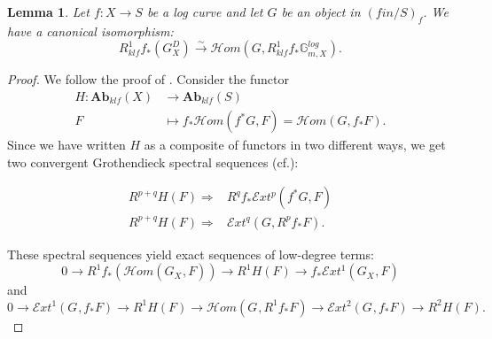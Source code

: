 \documentclass[a4paper,11pt]{amsart} %
\numberwithin{equation}{subsection}
\newcommand{\bd}[1]{{\mathbf{#1}}}
\def\sheafhom{\mathcal{H}om}
\def\sheafext{\mathcal{E}xt}
\newcommand{\cat}[1]{\bd{#1}}
\newcommand{\lra}{\longrightarrow}
\newcommand{\iso}{\stackrel{\sim}{\lra}}
\theoremstyle{definition}
\theoremstyle{plain}%
\newtheorem{lemma}[definition]{Lemma}
\theoremstyle{remark}
\begin{document}
\begin{lemma}\label{raynaudlog}
 Let $f: X \to S $ be a log curve and let $G$ be an object in $(fin/S)_f$. We have a canonical isomorphism:
 $$R^1_{klf}f_*(G_{X_{}}^D) \iso \sheafhom(G, R^1_{klf}f_*\mathbb{G}_{m,X_{}}^{log}). $$
 \end{lemma}
 
 \begin{proof} We follow the proof of \cite[Proposition 6.2.1]{Raynaud1970Specialisation-}. Consider the functor
\begin{align*}
    H \colon \cat{Ab}_{klf}(X) & \to \cat{Ab}_{klf}(S) \\
    F & \mapsto f_*\sheafhom(f^*G,F) = \sheafhom(G,f_* F).
\end{align*}
Since we have written $H$ as a composite of functors in two different ways, we get two convergent Grothendieck spectral sequences (cf.\cite{GrotSpectral}):
\begin{center}
\begin{align*}
R^{p+q}H(F) \Rightarrow & R^qf_*\sheafext^p(f^*G,F)\\
R^{p+q}H(F) \Rightarrow & \sheafext^q(G,R^pf_*F).
\end{align*}
\end{center}
These spectral sequences yield exact sequences of low-degree terms:
\begin{equation}
    0 \to R^1f_*(\sheafhom(G_{X_{}},F)) \to R^1H(F) \to f_*\sheafext^1(G_{X_{}},F)\label{eqn:short_exact_lowdeg_1}
\end{equation}
and
\begin{equation}
    0 \to \sheafext^1(G_{},f_*F)  \to R^1H(F) \to \sheafhom(G_{},R^1f_*F) \to \sheafext^2(G_{},f_*F) \to R^2H(F).\label{eqn:short_exact_lowdeg_2}
\end{equation}



\end{proof}
\end{document}
